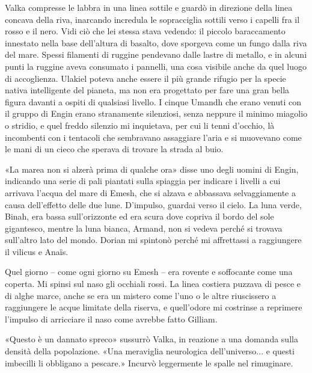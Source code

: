 Valka compresse le labbra in una linea sottile e guardò in direzione
della linea concava della riva, inarcando incredula le sopracciglia
sottili verso i capelli fra il rosso e il nero. Vidi ciò che lei stessa
stava vedendo: il piccolo baraccamento innestato nella base dell'altura
di basalto, dove sporgeva come un fungo dalla riva del mare. Spessi
filamenti di ruggine pendevano dalle lastre di metallo, e in alcuni
punti la ruggine aveva consumato i pannelli, una cosa visibile anche da
quel luogo di accoglienza. Ulakiel poteva anche essere il più grande
rifugio per la specie nativa intelligente del pianeta, ma non era
progettato per fare una gran bella figura davanti a ospiti di qualsiasi
livello. I cinque Umandh che erano venuti con il gruppo di Engin erano
stranamente silenziosi, senza neppure il minimo miagolio o stridio, e
quel freddo silenzio mi inquietava, per cui li tenni d'occhio, là
incombenti con i tentacoli che sembravano assaggiare l'aria e si
muovevano come le mani di un cieco che sperava di trovare la strada al
buio.

\begin{figure}
	\centering
	\def\svgwidth{\columnwidth}
	\scalebox{0.2}{}
\end{figure}

«La marea non si alzerà prima di qualche ora» disse uno degli uomini di
Engin, indicando una serie di pali piantati sulla spiaggia per indicare
i livelli a cui arrivava l'acqua del mare di Emesh, che si alzava e
abbassava selvaggiamente a causa dell'effetto delle due lune. D'impulso,
guardai verso il cielo. La luna verde, Binah, era bassa sull'orizzonte
ed era scura dove copriva il bordo del sole gigantesco, mentre la luna
bianca, Armand, non si vedeva perché si trovava sull'altro lato del
mondo. Dorian mi spintonò perché mi affrettassi a raggiungere il vilicus
e Anaïs.

Quel giorno -- come ogni giorno su Emesh -- era rovente e soffocante
come una coperta. Mi spinsi sul naso gli occhiali rossi. La linea
costiera puzzava di pesce e di alghe marce, anche se era un mistero come
l'uno o le altre riuscissero a raggiungere le acque limitate della
riserva, e quell'odore mi costrinse a reprimere l'impulso di arricciare
il naso come avrebbe fatto Gilliam.

«Questo è un dannato spreco» sussurrò Valka, in reazione a una domanda
sulla densità della popolazione. «Una meraviglia neurologica
dell'universo... e questi imbecilli li obbligano a pescare.» Incurvò
leggermente le spalle nel rimuginare.

